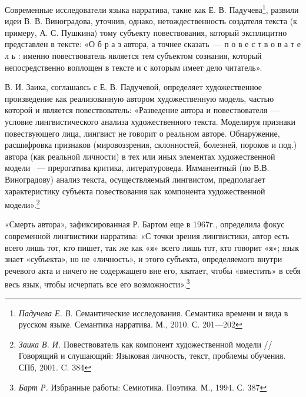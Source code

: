 \documentclass{kursa4}
\begin{document}
      Современные исследователи языка нарратива, такие как Е. В. Падучева\footnote{\textit{{Падучева Е. В. }}{Семантические исследования. Семантика времени и вида в русском языке. Семантика нарратива. М., 2010. С. 201—202}}, развили идеи В. В. Виноградова, уточнив, однако, нетождественность создателя текста (к примеру, А. С. Пушкина) тому субъекту повествования, который эксплицитно представлен в тексте:\newline
      «О б р а з автора, а точнее сказать~--- п о в е с т в о в а т е л ь : именно повествователь является тем субъектом сознания, который непосредственно воплощен в тексте и с которым имеет дело читатель». 

      В. И. Заика, соглашаясь с Е. В. Падучевой, определяет художественное произведение как реализованную автором художественную модель, частью которой и является повествователь: «Разведение автора и повествователя~--- условие лингвистического анализа художественного текста. Моделируя признаки повествующего лица, лингвист не говорит о реальном авторе. Обнаружение, расшифровка признаков (мировоззрения, склонностей, болезней, пороков и под.) автора (как реальной личности) в тех или иных элементах художественной модели ~--- прерогатива критика, литературоведа. Имманентный (по В.В. Виноградову) анализ текста, осуществляемый лингвистом, предполагает характеристику субъекта повествования как компонента художественной модели».\footnote{\textit{{Заика В. И. }}{Повествователь как компонент художественной модели // Говорящий и слушающий: Языковая личность, текст, проблемы обучения. СПб, 2001. C. 384}}

      «Смерть автора», зафиксированная Р. Бартом еще в 1967г., определила фокус современной лингвистики нарратива:\newline
      «С точки зрения лингвистики, автор есть всего лишь тот, кто пишет, так же как «я» всего лишь тот, кто говорит «я»; язык знает «субъекта», но не «личность», и этого субъекта, определяемого внутри речевого акта и ничего не содержащего вне его, хватает, чтобы «вместить» в себя весь язык, чтобы исчерпать все его возможности».\footnote{\textit{{Барт Р.}}{ Избранные работы: Семиотика. Поэтика. М., 1994. С. 387}}
\end{document}
